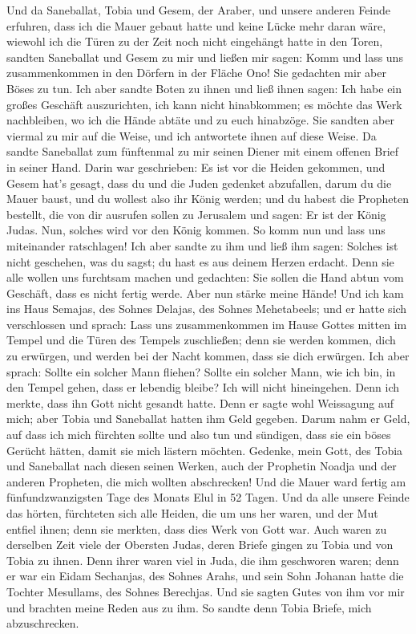  Und da Saneballat, Tobia und Gesem, der Araber, und
unsere anderen Feinde erfuhren, dass ich die Mauer gebaut hatte und
keine Lücke mehr daran wäre, wiewohl ich die Türen zu der Zeit noch
nicht eingehängt hatte in den Toren,  sandten Saneballat
und Gesem zu mir und ließen mir sagen: Komm und lass uns zusammenkommen
in den Dörfern in der Fläche Ono! Sie gedachten mir aber Böses zu tun.
 Ich aber sandte Boten zu ihnen und ließ ihnen sagen: Ich
habe ein großes Geschäft auszurichten, ich kann nicht hinabkommen; es
möchte das Werk nachbleiben, wo ich die Hände abtäte und zu euch
hinabzöge.  Sie sandten aber viermal zu mir auf die Weise,
und ich antwortete ihnen auf diese Weise.  Da sandte
Saneballat zum fünftenmal zu mir seinen Diener mit einem offenen Brief
in seiner Hand.  Darin war geschrieben: Es ist vor die
Heiden gekommen, und Gesem hat's gesagt, dass du und die Juden gedenket
abzufallen, darum du die Mauer baust, und du wollest also ihr König
werden;  und du habest die Propheten bestellt, die von dir
ausrufen sollen zu Jerusalem und sagen: Er ist der König Judas. Nun,
solches wird vor den König kommen. So komm nun und lass uns miteinander
ratschlagen!  Ich aber sandte zu ihm und ließ ihm sagen:
Solches ist nicht geschehen, was du sagst; du hast es aus deinem Herzen
erdacht.  Denn sie alle wollen uns furchtsam machen und
gedachten: Sie sollen die Hand abtun vom Geschäft, dass es nicht fertig
werde. Aber nun stärke meine Hände!  Und ich kam ins Haus
Semajas, des Sohnes Delajas, des Sohnes Mehetabeels; und er hatte sich
verschlossen und sprach: Lass uns zusammenkommen im Hause Gottes mitten
im Tempel und die Türen des Tempels zuschließen; denn sie werden kommen,
dich zu erwürgen, und werden bei der Nacht kommen, dass sie dich
erwürgen.  Ich aber sprach: Sollte ein solcher Mann
fliehen? Sollte ein solcher Mann, wie ich bin, in den Tempel gehen, dass
er lebendig bleibe? Ich will nicht hineingehen.  Denn ich
merkte, dass ihn Gott nicht gesandt hatte. Denn er sagte wohl Weissagung
auf mich; aber Tobia und Saneballat hatten ihm Geld gegeben.
 Darum nahm er Geld, auf dass ich mich fürchten sollte
und also tun und sündigen, dass sie ein böses Gerücht hätten, damit sie
mich lästern möchten.  Gedenke, mein Gott, des Tobia und
Saneballat nach diesen seinen Werken, auch der Prophetin Noadja und der
anderen Propheten, die mich wollten abschrecken!  Und die
Mauer ward fertig am fünfundzwanzigsten Tage des Monats Elul in 52
Tagen.  Und da alle unsere Feinde das hörten, fürchteten
sich alle Heiden, die um uns her waren, und der Mut entfiel ihnen; denn
sie merkten, dass dies Werk von Gott war.  Auch waren zu
derselben Zeit viele der Obersten Judas, deren Briefe gingen zu Tobia
und von Tobia zu ihnen.  Denn ihrer waren viel in Juda,
die ihm geschworen waren; denn er war ein Eidam Sechanjas, des Sohnes
Arahs, und sein Sohn Johanan hatte die Tochter Mesullams, des Sohnes
Berechjas.  Und sie sagten Gutes von ihm vor mir und
brachten meine Reden aus zu ihm. So sandte denn Tobia Briefe, mich
abzuschrecken.

